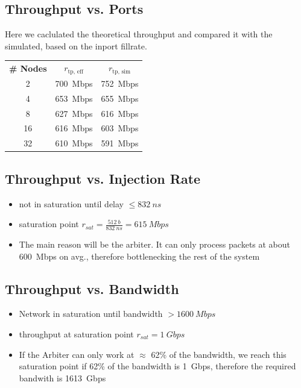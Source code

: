 \documentclass[]{scrartcl}
\begin{document}
    \subsection{Throughput vs. Ports}
        Here we caclulated the theoretical throughput and compared it with the simulated, based on the inport fillrate.
        \begin{table}[H]
            \centering
            \begin{tabular}{ccc}
            \textbf{\# Nodes} & \textbf{$r_\text{tp, eff}$} & \textbf{$r_\text{tp, sim}$}\\
            2 & \SI{700}{Mbps} & \SI{752}{Mbps}\\
            4 & \SI{653}{Mbps} & \SI{655}{Mbps}\\
            8 & \SI{627}{Mbps} & \SI{616}{Mbps}\\
            16 & \SI{616}{Mbps} & \SI{603}{Mbps}\\
            32 & \SI{610}{Mbps} & \SI{591}{Mbps}
            \end{tabular}
        \end{table}

    \subsection{Throughput vs. Injection Rate}
    \begin{itemize}
        \item not in saturation until delay $\leq \SI{832}{ns}$
        \item saturation point $r_{sat} = \frac{\SI{512}{b}}{\SI{832}{ns}} = \SI{615}{Mbps}$
        \item The main reason will be the arbiter. It can only process packets at about \SI{600}{Mbps} on avg., therefore bottlenecking the rest of the system
    \end{itemize}
    \subsection{Throughput vs. Bandwidth}
    \begin{itemize}
        \item Network in saturation until bandwidth $> \SI{1600}{Mbps}$
        \item throughput at saturation point $r_{sat} = \SI{1}{Gbps}$
        \item If the Arbiter can only work at $\approx$ 62\% of the bandwidth, we reach this saturation point if 62\% of the bandwidth is \SI{1}{Gbps}, therefore the required bandwith is \SI{1613}{Gbps}
    \end{itemize}
\end{document}
